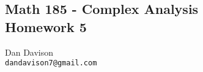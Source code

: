 \documentclass[12pt]{article}
\begin{document}
\begin{center}
  \section*{
    Math 185 - Complex Analysis\\
    Homework 5\\
  }
\end{center}
\begin{center}
  \small{
    Dan Davison\\
    \texttt{dandavison7@gmail.com}
  }
\end{center}








\end{document}
